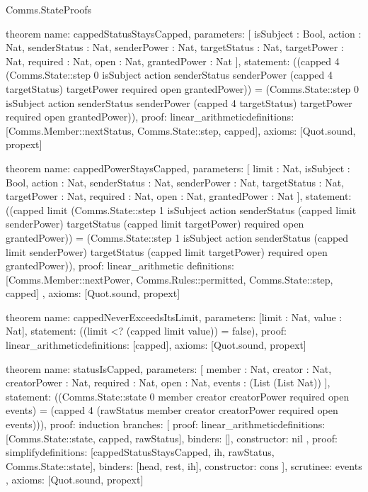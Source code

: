\begin{lexlean}{Comms.StateProofs}
\begin{semanticmodule}
theorem{
  name: cappedStatusStaysCapped,
  parameters: [
    isSubject : Bool,
    action : Nat,
    senderStatus : Nat,
    senderPower : Nat,
    targetStatus : Nat,
    targetPower : Nat,
    required : Nat,
    open : Nat,
    grantedPower : Nat
  ],
  statement: ((capped 4 (Comms.State::step 0 isSubject action senderStatus senderPower (capped 4 targetStatus) targetPower required open grantedPower)) = (Comms.State::step 0 isSubject action senderStatus senderPower (capped 4 targetStatus) targetPower required open grantedPower)),
  proof: linear_arithmetic{definitions: [Comms.Member::nextStatus, Comms.State::step, capped]},
  axioms: [Quot.sound, propext]
}

theorem{
  name: cappedPowerStaysCapped,
  parameters: [
    limit : Nat,
    isSubject : Bool,
    action : Nat,
    senderStatus : Nat,
    senderPower : Nat,
    targetStatus : Nat,
    targetPower : Nat,
    required : Nat,
    open : Nat,
    grantedPower : Nat
  ],
  statement: ((capped limit (Comms.State::step 1 isSubject action senderStatus (capped limit senderPower) targetStatus (capped limit targetPower) required open grantedPower)) = (Comms.State::step 1 isSubject action senderStatus (capped limit senderPower) targetStatus (capped limit targetPower) required open grantedPower)),
  proof: linear_arithmetic{
    definitions: [Comms.Member::nextPower, Comms.Rules::permitted, Comms.State::step, capped]
  },
  axioms: [Quot.sound, propext]
}

theorem{
  name: cappedNeverExceedsItsLimit,
  parameters: [limit : Nat, value : Nat],
  statement: ((limit <? (capped limit value)) = false),
  proof: linear_arithmetic{definitions: [capped]},
  axioms: [Quot.sound, propext]
}

theorem{
  name: statusIsCapped,
  parameters: [
    member : Nat,
    creator : Nat,
    creatorPower : Nat,
    required : Nat,
    open : Nat,
    events : (List (List Nat))
  ],
  statement: ((Comms.State::state 0 member creator creatorPower required open events) = (capped 4 (rawStatus member creator creatorPower required open events))),
  proof: induction{
    branches: [
      {
        proof: linear_arithmetic{definitions: [Comms.State::state, capped, rawStatus]},
        binders: [],
        constructor: nil
      },
      {
        proof: simplify{definitions: [cappedStatusStaysCapped, ih, rawStatus, Comms.State::state]},
        binders: [head, rest, ih],
        constructor: cons
      }
    ],
    scrutinee: events
  },
  axioms: [Quot.sound, propext]
}


\end{semanticmodule}
\end{lexlean}
